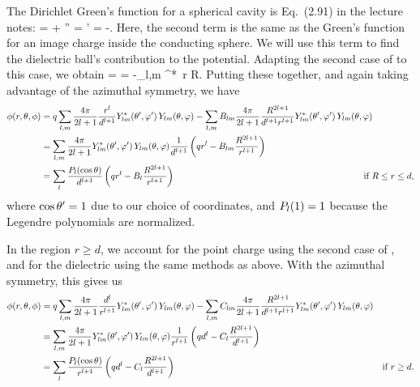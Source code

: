 \begin{solution}
	The Dirichlet Green's function for a spherical cavity is Eq.~(2.91) in the lecture notes:
	\beq
		\Gdxxp =  + 
		 \vx'' = \vx' 
		\qand \alp = -.
	\eeq
	Here, the second term is the same as the Green's function for an image charge inside the conducting sphere.  We will use this term to find the dielectric ball's contribution to the potential.  Adapting the second case of  to this case, we obtain
	\beq
		\Gpxxp = 
		= -\sum_{l,m}   \Ylm^*\tvp \, \Ylm\tv \quad \tif r \leq R.
	\eeq
	Putting these together, and again taking advantage of the azimuthal symmetry, we have
	\begin{align}
		\phi(r, \theta, \phi) &= q \sum_{l,m} \frac{4\pi}{2l + 1} \frac{r^l}{d^{l + 1}} Y_{l m}^*(\theta', \varphi') \, Y_{l m}(\theta, \varphi) - \sum_{l,m} B_{l m} \frac{4\pi}{2l + 1} \frac{R^{2l+1}}{d^{l+1} r^{l + 1}} Y_{l m}^*(\theta', \varphi') \, Y_{l m}(\theta, \varphi) \notag \\
		&= \sum_{l,m} \frac{4\pi}{2l + 1} Y_{l m}^*(\theta', \varphi') \, Y_{l m}(\theta, \varphi) \frac{1}{d^{l+1}} \left( q r^l - B_{l m} \frac{R^{2l+1}}{r^{l+1}} \right) \notag \\
		&= \sum_{l} \frac{P_l(\cos\theta)}{d^{l+1}} \left( q r^l - B_l \frac{R^{2l+1}}{r^{l+1}} \right)
		\phantom{mmmmmmmmmmmmmmmmmmmmmmmm} \text{if } R \leq r \leq d, \label{middle}
	\end{align}
	where $\cos\theta' = 1$ due to our choice of coordinates, and $P_l(1) = 1$ because the Legendre polynomials are normalized.
	
	In the region $r \geq d$, we account for the point charge using the second case of , and for the dielectric using the same methods as above.  With the azimuthal symmetry, this gives us
	\begin{align}
		\phi(r, \theta, \phi) &= q \sum_{l,m} \frac{4\pi}{2l + 1} \frac{d^l}{r^{l + 1}} Y_{l m}^*(\theta', \varphi') \, Y_{l m}(\theta, \varphi) - \sum_{l,m} C_{l m} \frac{4\pi}{2l + 1} \frac{R^{2l+1}}{d^{l+1} r^{l + 1}} Y_{l m}^*(\theta', \varphi') \, Y_{l m}(\theta, \varphi) \notag \\
		&= \sum_{l,m} \frac{4\pi}{2l + 1} Y_{l m}^*(\theta', \varphi') \, Y_{l m}(\theta, \varphi) \frac{1}{r^{l+1}} \left( q d^l - C_l \frac{R^{2l+1}}{d^{l+1}} \right) \notag \\
		&= \sum_{l} \frac{P_l(\cos\theta)}{r^{l+1}} \left( q d^l - C_l \frac{R^{2l+1}}{d^{l+1}} \right) & \text{if } r \geq d. \label{outside}
	\end{align}
	

\end{solution}
